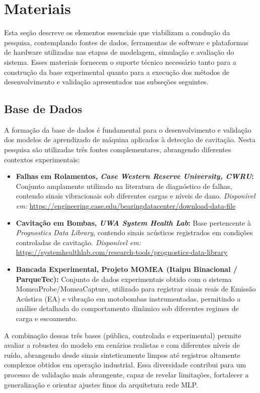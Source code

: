 \section{Materiais}
Esta seção descreve os elementos essenciais que viabilizam a condução da pesquisa, contemplando fontes de dados, ferramentas de software e plataformas de hardware utilizadas nas etapas de modelagem, simulação e avaliação do sistema. Esses materiais fornecem o suporte técnico necessário tanto para a construção da base experimental quanto para a execução dos métodos de desenvolvimento e validação apresentados nas subseções seguintes.
\subsection{Base de Dados}

A formação da base de dados é fundamental para o desenvolvimento e validação dos modelos de aprendizado de máquina aplicados à detecção de cavitação. Nesta pesquisa são utilizadas três fontes complementares, abrangendo diferentes contextos experimentais:

\begin{itemize}
	\item \textbf{Falhas em Rolamentos, \textit{Case Western Reserve University, CWRU}:}  
	Conjunto amplamente utilizado na literatura de diagnóstico de falhas, contendo sinais vibracionais sob diferentes cargas e níveis de dano.  
	\textit{Disponível em:} \url{https://engineering.case.edu/bearingdatacenter/download-data-file}
	
	\item \textbf{Cavitação em Bombas, \textit{ UWA System Health Lab}:}  
	Base pertencente à \textit{Prognostics Data Library}, contendo sinais acústicos registrados em condições controladas de cavitação.  
	\textit{Disponível em:} \url{https://systemhealthlab.com/research-tools/prognostics-data-library}
	
	\item \textbf{Bancada Experimental, Projeto MOMEA (Itaipu Binacional / ParqueTec):}
	Conjunto de dados experimentais obtido com o sistema MomeaProbe/MomeaCapture, utilizado para registrar sinais reais de Emissão Acústica (EA) e vibração em motobombas instrumentadas, permitindo a análise detalhada do comportamento dinâmico sob diferentes regimes de carga e escoamento.	
\end{itemize}

A combinação dessas três bases (pública, controlada e experimental) permite avaliar a robustez do modelo em cenários realistas e com diferentes níveis de ruído, abrangendo desde sinais sinteticamente limpos até registros altamente complexos obtidos em operação industrial. Essa diversidade contribui para um processo de validação mais abrangente, capaz de revelar limitações, fortalecer a generalização e orientar ajustes finos da arquitetura rede MLP.


